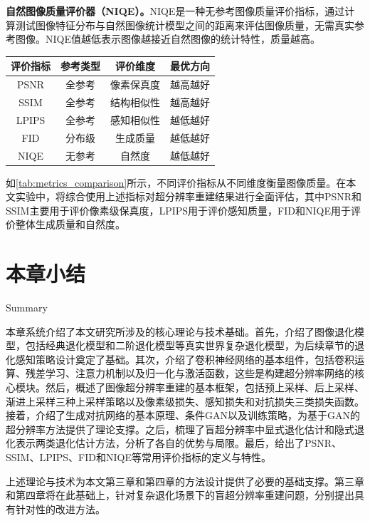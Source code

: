 \textbf{自然图像质量评价器（NIQE）。}NIQE\cite{mittal2012making}是一种无参考图像质量评价指标，通过计算测试图像特征分布与自然图像统计模型之间的距离来评估图像质量，无需真实参考图像。NIQE值越低表示图像越接近自然图像的统计特性，质量越高。

\begin{table}[htbp]
  \label{tab:metrics_comparison}
  \begin{tabular}{cccc}
    \toprule
    评价指标 & 参考类型 & 评价维度 & 最优方向 \\
    \midrule
    PSNR     & 全参考   & 像素保真度 & 越高越好 \\
    SSIM     & 全参考   & 结构相似性 & 越高越好 \\
    LPIPS    & 全参考   & 感知相似性 & 越低越好 \\
    FID      & 分布级   & 生成质量   & 越低越好 \\
    NIQE     & 无参考   & 自然度     & 越低越好 \\
    \bottomrule
  \end{tabular}
\end{table}

如\autoref{tab:metrics_comparison}所示，不同评价指标从不同维度衡量图像质量。在本文实验中，将综合使用上述指标对超分辨率重建结果进行全面评估，其中PSNR和SSIM主要用于评价像素级保真度，LPIPS用于评价感知质量，FID和NIQE用于评价整体生成质量和自然度。

\section{本章小结}{Summary}

本章系统介绍了本文研究所涉及的核心理论与技术基础。首先，介绍了图像退化模型，包括经典退化模型和二阶退化模型等真实世界复杂退化模型，为后续章节的退化感知策略设计奠定了基础。其次，介绍了卷积神经网络的基本组件，包括卷积运算、残差学习、注意力机制以及归一化与激活函数，这些是构建超分辨率网络的核心模块。然后，概述了图像超分辨率重建的基本框架，包括预上采样、后上采样、渐进上采样三种上采样策略以及像素级损失、感知损失和对抗损失三类损失函数。接着，介绍了生成对抗网络的基本原理、条件GAN以及训练策略，为基于GAN的超分辨率方法提供了理论支撑。之后，梳理了盲超分辨率中显式退化估计和隐式退化表示两类退化估计方法，分析了各自的优势与局限。最后，给出了PSNR、SSIM、LPIPS、FID和NIQE等常用评价指标的定义与特性。

上述理论与技术为本文第三章和第四章的方法设计提供了必要的基础支撑。第三章和第四章将在此基础上，针对复杂退化场景下的盲超分辨率重建问题，分别提出具有针对性的改进方法。
